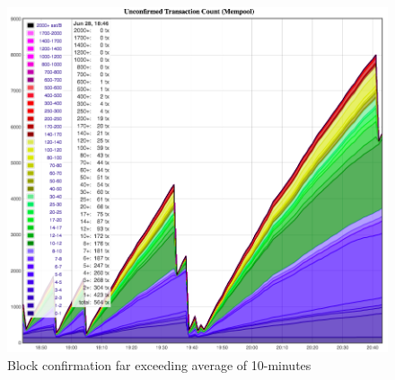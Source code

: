 \begin{figure}[h]
\centering
\includegraphics[width=1\textwidth]{images/block_time_anomalies.png}
\caption{Block confirmation far exceeding average of 10-minutes}
\end{figure}
